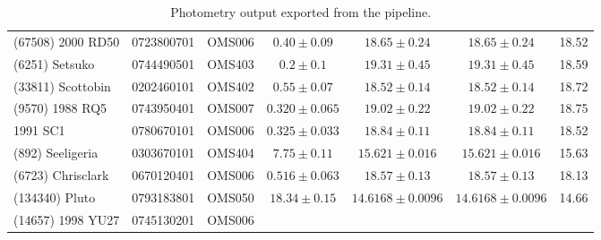 \begin{table}[t]
\begin{tabular}{lllcccc}
(67508) 2000 RD50 & 0723800701 & OMS006 & $0.40 \pm 0.09$ & $18.65 \pm 0.24$ & $18.65 \pm 0.24$ & 18.52 \\
(6251) Setsuko & 0744490501 & OMS403 & $0.2 \pm 0.1$ & $19.31 \pm 0.45$ & $19.31 \pm 0.45$ & 18.59 \\
(33811) Scottobin & 0202460101 & OMS402 & $0.55 \pm 0.07$ & $18.52 \pm 0.14$ & $18.52 \pm 0.14$ & 18.72 \\
(9570) 1988 RQ5 & 0743950401 & OMS007 & $0.320 \pm 0.065$ & $19.02 \pm 0.22$ & $19.02 \pm 0.22$ & 18.75 \\
1991 SC1 & 0780670101 & OMS006 & $0.325 \pm 0.033$ & $18.84 \pm 0.11$ & $18.84 \pm 0.11$ & 18.52 \\
(892) Seeligeria & 0303670101 & OMS404 & $7.75 \pm 0.11$ & $15.621 \pm 0.016$ & $15.621 \pm 0.016$ & 15.63 \\
(6723) Chrisclark & 0670120401 & OMS006 & $0.516 \pm 0.063$ & $18.57 \pm 0.13$ & $18.57 \pm 0.13$ & 18.13 \\
(134340) Pluto & 0793183801 & OMS050 & $18.34 \pm 0.15$ & $14.6168 \pm 0.0096$ & $14.6168 \pm 0.0096$ & 14.66 \\
(14657) 1998 YU27 & 0745130201 & OMS006 &  &  &  &  \\
\bottomrule
\end{tabular}
\caption{Photometry output exported from the pipeline.}
\label{tab:photometry_output}
\end{table}